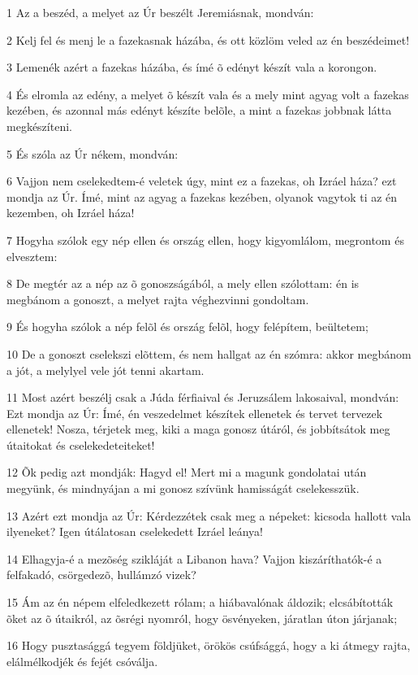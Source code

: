 \par 1 Az a beszéd, a melyet az Úr beszélt Jeremiásnak, mondván:
\par 2 Kelj fel és menj le a fazekasnak házába, és ott közlöm veled az én beszédeimet!
\par 3 Lemenék azért a fazekas házába, és ímé õ edényt készít vala a korongon.
\par 4 És elromla az edény, a melyet õ készít vala és a mely mint agyag volt a fazekas kezében, és azonnal más edényt készíte belõle, a mint a fazekas jobbnak látta megkészíteni.
\par 5 És szóla az Úr nékem, mondván:
\par 6 Vajjon nem cselekedtem-é veletek úgy, mint ez a fazekas, oh Izráel háza? ezt mondja az Úr. Ímé, mint az agyag a fazekas kezében, olyanok vagytok ti az én kezemben, oh Izráel háza!
\par 7 Hogyha szólok egy nép ellen és ország ellen, hogy kigyomlálom, megrontom és elvesztem:
\par 8 De megtér az a nép az õ gonoszságából, a mely ellen szólottam: én is megbánom a gonoszt, a melyet rajta véghezvinni gondoltam.
\par 9 És hogyha szólok a nép felõl és ország felõl, hogy felépítem, beültetem;
\par 10 De a gonoszt cselekszi elõttem, és nem hallgat az én szómra: akkor megbánom a jót, a melylyel vele jót tenni akartam.
\par 11 Most azért beszélj csak a Júda férfiaival és Jeruzsálem lakosaival, mondván: Ezt mondja az Úr: Ímé, én veszedelmet készítek ellenetek és tervet tervezek ellenetek! Nosza, térjetek meg, kiki a maga gonosz útáról, és jobbítsátok meg útaitokat és cselekedeteiteket!
\par 12 Õk pedig azt mondják: Hagyd el! Mert mi a magunk gondolatai után megyünk, és mindnyájan a mi gonosz szívünk hamisságát cselekesszük.
\par 13 Azért ezt mondja az Úr: Kérdezzétek csak meg a népeket: kicsoda hallott vala ilyeneket? Igen útálatosan cselekedett Izráel leánya!
\par 14 Elhagyja-é a mezõség szikláját a Libanon hava? Vajjon kiszáríthatók-é a felfakadó, csörgedezõ, hullámzó vizek?
\par 15 Ám az én népem elfeledkezett rólam; a hiábavalónak áldozik; elcsábították õket az õ útaikról, az õsrégi nyomról, hogy ösvényeken, járatlan úton járjanak;
\par 16 Hogy pusztasággá tegyem földjüket, örökös csúfsággá, hogy a ki átmegy rajta, elálmélkodjék és fejét csóválja.
